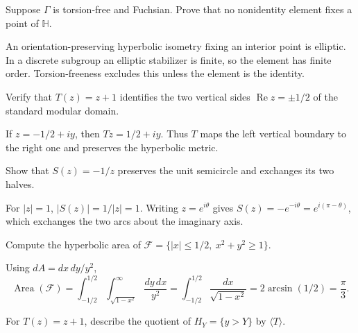 \begin{problem}\label{prob:vii35-02}
Suppose \(\Gamma\) is torsion-free and Fuchsian.  Prove that no nonidentity element fixes a point of \(\mathbb H\).
\end{problem}

\begin{solution}
An orientation-preserving hyperbolic isometry fixing an interior point is elliptic.  In a discrete subgroup an elliptic stabilizer is finite, so the element has finite order.  Torsion-freeness excludes this unless the element is the identity.
\end{solution}

\begin{problem}\label{prob:vii35-03}
Verify that \(T(z)=z+1\) identifies the two vertical sides \(\operatorname{Re}z=\pm1/2\) of the standard modular domain.
\end{problem}

\begin{solution}
If \(z=-1/2+iy\), then \(Tz=1/2+iy\).  Thus \(T\) maps the left vertical boundary to the right one and preserves the hyperbolic metric.
\end{solution}

\begin{problem}\label{prob:vii35-04}
Show that \(S(z)=-1/z\) preserves the unit semicircle and exchanges its two halves.
\end{problem}

\begin{solution}
For \(|z|=1\), \(|S(z)|=1/|z|=1\).  Writing \(z=e^{i\theta}\) gives \(S(z)=-e^{-i\theta}=e^{i(\pi-\theta)}\), which exchanges the two arcs about the imaginary axis.
\end{solution}

\begin{problem}\label{prob:vii35-05}
Compute the hyperbolic area of \(\mathcal F=\{|x|\le1/2,\ x^2+y^2\ge1\}\).
\end{problem}

\begin{solution}
Using \(dA=dx\,dy/y^2\),
\[
\operatorname{Area}(\mathcal F)=\int_{-1/2}^{1/2}\int_{\sqrt{1-x^2}}^\infty \frac{dy\,dx}{y^2}
=\int_{-1/2}^{1/2}\frac{dx}{\sqrt{1-x^2}}
=2\arcsin(1/2)=\frac\pi3.
\]
\end{solution}

\begin{problem}\label{prob:vii35-06}
For \(T(z)=z+1\), describe the quotient of \(H_Y=\{y>Y\}\) by \(\langle T\rangle\).
\end{problem}

